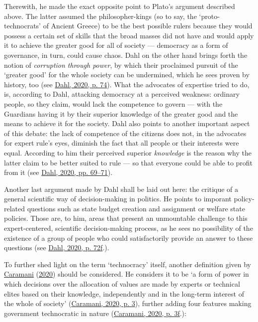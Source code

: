 \documentclass[
  12pt,
  english,
]{article}
\begin{document}
Therewith, he made the exact opposite point to Plato's argument
described above. The latter assumed the philosopher-kings (so to say,
the `proto-technocrats' of Ancient Greece) to be the best possible
rulers because they would possess a certain set of skills that the broad
masses did not have and would apply it to achieve the greater good for
all of society --- democracy as a form of governance, in turn, could
cause chaos. Dahl on the other hand brings forth the notion of
\emph{corruption through power}, by which their proclaimed pursuit of
the `greater good' for the whole society can be undermined, which he
sees proven by history, too (see
\protect\hyperlink{ref-dahl_onDemocracy}{Dahl, 2020, p. 74}). What the
advocates of expertise tried to do, is, according to Dahl, attacking
democracy at a perceived weakness: ordinary people, so they claim, would
lack the competence to govern --- with the Guardians having it by their
superior knowledge of the greater good and the means to achieve it for
the society. Dahl also points to another important aspect of this
debate: the lack of competence of the citizens does not, in the
advocates for expert rule's eyes, diminish the fact that all people or
their interests were equal. According to him their perceived superior
\emph{knowledge} is the reason why the latter claim to be better suited
to rule --- so that everyone could be able to profit from it (see
\protect\hyperlink{ref-dahl_onDemocracy}{Dahl, 2020, pp. 69--71}).

Another last argument made by Dahl shall be laid out here: the critique
of a general scientific way of decision-making in politics. He points to
imporant policy-related questions such as state budget creation and
assignment or welfare state policies. Those are, to him, areas that
present an unmountable challenge to this expert-centered, scientific
decision-making process, as he sees no possibility of the existence of a
group of people who could satisfactorily provide an answer to these
questions (see \protect\hyperlink{ref-dahl_onDemocracy}{Dahl, 2020, p.
72f}.).

To further shed light on the term `technocracy' itself, another
definition given by
\protect\hyperlink{ref-caramani2020technocratic}{Caramani}
(\protect\hyperlink{ref-caramani2020technocratic}{2020}) should be
considered. He considers it to be `a form of power in which decisions
over the allocation of values are made by experts or technical elites
based on their knowledge, independently and in the long-term interest of
the whole of society'
(\protect\hyperlink{ref-caramani2020technocratic}{Caramani, 2020, p.
3}), further adding four features making government technocratic in
nature (\protect\hyperlink{ref-caramani2020technocratic}{Caramani, 2020,
p. 3f}.):
\end{document}
